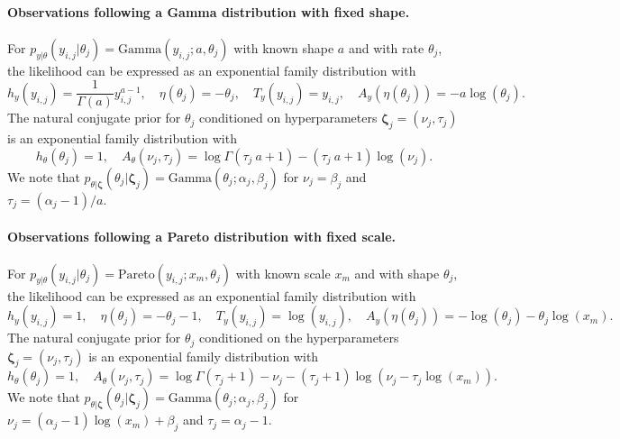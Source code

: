 \paragraph{Observations following a Gamma distribution with fixed shape.}
For $p_{{y}\vert{\theta}}({y}_{i,j} \vert {\theta}_j) = \text{Gamma}({y}_{i,j};a, {\theta}_j)$ with known shape $a$ and with rate ${\theta}_j$, the likelihood can be expressed as an exponential family distribution with
\begin{equation*}
h_y({y}_{i,j}) = \frac{1}{\Gamma(a)}{y}_{i,j}^{a-1} ,\quad \eta(\theta_j) = -\theta_j ,\quad T_y({y}_{i,j}) = {y}_{i,j},\quad {A}_{{y}}({\eta}({\theta}_j)) =  - a \log(\theta_j).
\end{equation*}
The natural conjugate prior for ${\theta}_j$ conditioned on hyperparameters $\boldsymbol{\zeta}_j = (\nu_j, \tau_j)$ is an exponential family distribution with 
\begin{equation*} 
h_{{\theta}}({\theta}_j) = 1, \quad A_{\theta}({\nu}_j, {\tau}_j) = \log \Gamma(\tau_j \: a + 1) - (\tau_j \: a+1)\log(\nu_j).
\end{equation*}
We note that $p_{\theta\vert \boldsymbol{\zeta}}(\theta_j\vert \boldsymbol{\zeta}_j)= \text{Gamma}(\theta_j;\alpha_j,\beta_j)$ for $\nu_j=\beta_j$ and $\tau_j= (\alpha_j-1) / a$.



\paragraph{Observations following a Pareto distribution with fixed scale.}
For $p_{{y}\vert{\theta}}({y}_{i,j} \vert {\theta}_j) = \text{Pareto}({y}_{i,j};x_m, {\theta}_j)$ with known scale $x_m$ and with shape ${\theta}_j$, the likelihood can be expressed as an exponential family distribution with
\begin{equation*}
h_y({y}_{i,j}) = 1 ,\quad \eta(\theta_j) = -\theta_j -1,\quad T_y({y}_{i,j}) = \log({y}_{i,j}),\quad {A}_{{y}}({\eta}({\theta}_j)) =  - \log(\theta_j) - \theta_j \log(x_m) .
\end{equation*}
The natural conjugate prior for ${\theta}_j$ conditioned on the hyperparameters $\boldsymbol{\zeta}_j = (\nu_j, \tau_j)$ is an exponential family distribution with 
\begin{equation*} 
h_{{\theta}}({\theta}_j) = 1, \quad A_{\theta}({\nu}_j, {\tau}_j) = \log \Gamma(\tau_j + 1) - \nu_j  - (\tau_j +1)\log(\nu_j - \tau_j \log(x_m)).
\end{equation*}
We note that $p_{\theta\vert \boldsymbol{\zeta}}(\theta_j\vert \boldsymbol{\zeta}_j)= \text{Gamma}(\theta_j;\alpha_j,\beta_j)$ for $\nu_j=(\alpha_j-1)\log(x_m) + \beta_j$ and $\tau_j=  \alpha_j-1$.


